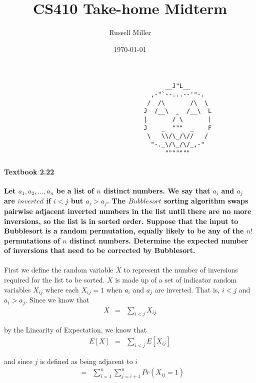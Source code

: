 \documentclass{article}
\title{CS410 Take-home Midterm}
\author{Russell Miller}
\date{\today}
\begin{document}
\maketitle

\begin{verbatim}
                                             __J"L__
                                         ,-"`--...--'"-.
                                        /  /\       /\  \
                                       J  /__\  _  /__\  L
                                       |       / \       |
                                       J    _  """  _    F
                                        \   \\/\_/\//   /
                                         "-._\/\_/\/_,-"
                                             """""""
\end{verbatim}

\paragraph{Textbook 2.22\\}
\textbf{Let $a_1, a_2, ..., a_n$ be a list of $n$ distinct numbers. We say that
$a_i$ and $a_j$ are $inverted$ if $i<j$ but $a_i>a_j$. The $Bubblesort$ sorting
algorithm swaps pairwise adjacent inverted numbers in the list until there are 
no more inversions, so the list is in sorted order. Suppose that the input to 
Bubblesort is a random permutation, equally likely to be any of the $n!$ 
permutations of $n$ distinct numbers. Determine the expected number of 
inversions that need to be corrected by Bubblesort.\\\\}
First we define the random variable $X$ to represent the number of inversions 
required for the list to be sorted. $X$ is made up of a set of indicator random
variables $X_{ij}$ where each $X_{ij} = 1$ when $a_i$ and $a_j$ are inverted. 
That is, $i<j$ and $a_i>a_j$. Since we know that
\begin{eqnarray*}
X & = & \sum\limits_{i<j} X_{ij}
\end{eqnarray*}

by the Linearity of Expectation, we know that
\begin{eqnarray*}
E[X] & = & \sum\limits_{i<j} E[X_{ij}]
\end{eqnarray*}

and since $j$ is defined as being adjacent to $i$
\begin{eqnarray*}
     & = & \sum\limits_{i=1}^n \sum\limits_{j=i+1}^n Pr(X_{ij}=1)
\end{eqnarray*}
\end{document}
